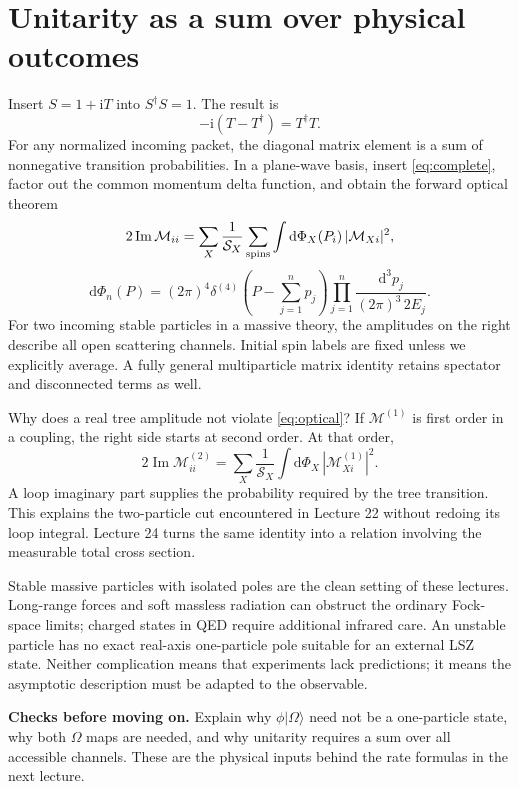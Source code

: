 \documentclass[11pt]{article}
\newcommand{\dd}{\mathrm d}
\newcommand{\ii}{\mathrm i}
\newcommand{\ket}[1]{\lvert#1\rangle}
\newcommand{\module}[1]{\clearpage\section{#1}}
\newcommand{\cM}{\mathcal M}
\newcommand{\cS}{\mathcal S}
\begin{document}
\module{Unitarity as a sum over physical outcomes}
Insert \(S=1+\ii T\) into \(S^\dagger S=1\). The result is
\begin{equation}
 -\ii(T-T^\dagger)=T^\dagger T.
 \label{eq:Tunitarity}
\end{equation}
For any normalized incoming packet, the diagonal matrix element is a sum
of nonnegative transition probabilities. In a plane-wave basis, insert
\eqref{eq:complete}, factor out the common momentum delta function, and
obtain the forward optical theorem
\begin{equation}
 2\operatorname{Im}\cM_{ii}
 =\sum_X\frac{1}{\cS_X}\sum_{\rm spins}
 \int\dd\Phi_X(P_i)\,|\cM_{Xi}|^2,
 \label{eq:optical}
\end{equation}
\begin{equation}
 \dd\Phi_n(P)=(2\pi)^4\delta^{(4)}\!\left(P-\sum_{j=1}^np_j\right)
 \prod_{j=1}^n\frac{\dd^3p_j}{(2\pi)^3\,2E_j}.
 \label{eq:phase}
\end{equation}
For two incoming stable particles in a massive theory, the amplitudes on
the right describe all open scattering channels. Initial spin labels are
fixed unless we explicitly average. A fully general multiparticle matrix
identity retains spectator and disconnected terms as well.

Why does a real tree amplitude not violate \eqref{eq:optical}? If
\(\cM^{(1)}\) is first order in a coupling, the right side starts at second
order. At that order,
\begin{equation}
 2\operatorname{Im}\cM^{(2)}_{ii}
 =\sum_X\frac1{\cS_X}\int\dd\Phi_X\,
 |\cM^{(1)}_{Xi}|^2.
\end{equation}
A loop imaginary part supplies the probability required by the tree
transition. This explains the two-particle cut encountered in Lecture 22
without redoing its loop integral. Lecture 24 turns the same identity into
a relation involving the measurable total cross section.

\begin{remarkbox}
Stable massive particles with isolated poles are the clean setting of
these lectures. Long-range forces and soft massless radiation can obstruct
the ordinary Fock-space limits; charged states in QED require additional
infrared care. An unstable particle has no exact real-axis one-particle
pole suitable for an external LSZ state. Neither complication means that
experiments lack predictions; it means the asymptotic description must be
adapted to the observable.
\end{remarkbox}
\textbf{Checks before moving on.} Explain why \(\phi\ket{\Omega}\) need
not be a one-particle state, why both \(\Omega\) maps are needed, and why
unitarity requires a sum over all accessible channels. These are the
physical inputs behind the rate formulas in the next lecture.
\end{document}
